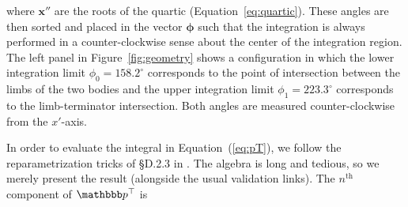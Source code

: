 \documentclass[modern]{aastex62}
\begin{document}
%
where $\mathbf{x''}$ are the roots of the quartic (Equation~\ref{eq:quartic}).
These angles are then sorted and placed in the vector $\pmb{\phi}$ such that
the integration is always performed in a counter-clockwise sense about
the center of the integration region.
%
The left panel in Figure~\ref{fig:geometry} shows a configuration in which
the lower integration limit $\phi_0 = 158.2^\circ$ corresponds to the
point of intersection between the limbs of the two bodies and the upper
integration limit $\phi_1 = 223.3^\circ$ corresponds to the
limb-terminator intersection. Both angles are measured counter-clockwise
from the $x'$-axis.

In order to evaluate the integral in Equation~(\ref{eq:pT}),
we follow the reparametrization tricks of \S{D.2.3} in \citet{Luger2019}.
The algebra is long and tedious, so we merely present the result
(alongside the usual validation links). The $n^\text{th}$ component
of $\pT$ is
%
\end{document}
